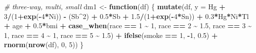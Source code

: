 \documentclass[12pt, twoside]{amherstthesis}
\newenvironment{Shaded}{\begin{snugshade}}{\end{snugshade}}
\newcommand{\AttributeTok}[1]{\textcolor[rgb]{0.13,0.29,0.53}{#1}}
\newcommand{\CommentTok}[1]{\textcolor[rgb]{0.56,0.35,0.01}{\textit{#1}}}
\newcommand{\ControlFlowTok}[1]{\textcolor[rgb]{0.13,0.29,0.53}{\textbf{#1}}}
\newcommand{\DecValTok}[1]{\textcolor[rgb]{0.00,0.00,0.81}{#1}}
\newcommand{\FloatTok}[1]{\textcolor[rgb]{0.00,0.00,0.81}{#1}}
\newcommand{\FunctionTok}[1]{\textcolor[rgb]{0.13,0.29,0.53}{\textbf{#1}}}
\newcommand{\NormalTok}[1]{#1}
\newcommand{\OtherTok}[1]{\textcolor[rgb]{0.56,0.35,0.01}{#1}}
\newcommand{\SpecialCharTok}[1]{\textcolor[rgb]{0.81,0.36,0.00}{\textbf{#1}}}
\begin{document}
\begin{Shaded}
\begin{Highlighting}[]
\CommentTok{\# three{-}way, multi, small}
\NormalTok{dm1 }\OtherTok{\textless{}{-}} \ControlFlowTok{function}\NormalTok{(df) \{}
  \FunctionTok{mutate}\NormalTok{(df, }\AttributeTok{y =} 
\NormalTok{           Hg }\SpecialCharTok{+} \DecValTok{3}\SpecialCharTok{/}\NormalTok{(}\DecValTok{1}\SpecialCharTok{+}\FunctionTok{exp}\NormalTok{(}\SpecialCharTok{{-}}\DecValTok{4}\SpecialCharTok{*}\NormalTok{Ni)) }\SpecialCharTok{{-}}\NormalTok{ (Sb}\SpecialCharTok{\^{}}\DecValTok{2}\NormalTok{) }\SpecialCharTok{+} \FloatTok{0.5}\SpecialCharTok{*}\NormalTok{Sb }\SpecialCharTok{+} \FloatTok{1.5}\SpecialCharTok{/}\NormalTok{(}\DecValTok{1}\SpecialCharTok{+}\FunctionTok{exp}\NormalTok{(}\SpecialCharTok{{-}}\DecValTok{4}\SpecialCharTok{*}\NormalTok{Sn)) }\SpecialCharTok{+} 
           \FloatTok{0.3}\SpecialCharTok{*}\NormalTok{Hg}\SpecialCharTok{*}\NormalTok{Ni}\SpecialCharTok{*}\NormalTok{Tl }\SpecialCharTok{+} 
\NormalTok{           age }\SpecialCharTok{+} \FloatTok{0.5}\SpecialCharTok{*}\NormalTok{bmi }\SpecialCharTok{+} 
           \FunctionTok{case\_when}\NormalTok{(race }\SpecialCharTok{==} \DecValTok{1} \SpecialCharTok{\textasciitilde{}} \DecValTok{1}\NormalTok{, }
\NormalTok{                     race }\SpecialCharTok{==} \DecValTok{2} \SpecialCharTok{\textasciitilde{}} \FloatTok{1.5}\NormalTok{, }
\NormalTok{                     race }\SpecialCharTok{==} \DecValTok{3} \SpecialCharTok{\textasciitilde{}} \DecValTok{1}\NormalTok{, }
\NormalTok{                     race }\SpecialCharTok{==} \DecValTok{4} \SpecialCharTok{\textasciitilde{}} \DecValTok{1}\NormalTok{, }
\NormalTok{                     race }\SpecialCharTok{==} \DecValTok{5} \SpecialCharTok{\textasciitilde{}} \FloatTok{1.5}\NormalTok{) }\SpecialCharTok{+}
           \FunctionTok{ifelse}\NormalTok{(smoke }\SpecialCharTok{==} \DecValTok{1}\NormalTok{, }\SpecialCharTok{{-}}\DecValTok{1}\NormalTok{, }\FloatTok{0.5}\NormalTok{) }\SpecialCharTok{+}
           \FunctionTok{rnorm}\NormalTok{(}\FunctionTok{nrow}\NormalTok{(df), }\DecValTok{0}\NormalTok{, }\DecValTok{5}\NormalTok{))}
\NormalTok{\}}


\end{Highlighting}
\end{Shaded}
\end{document}
